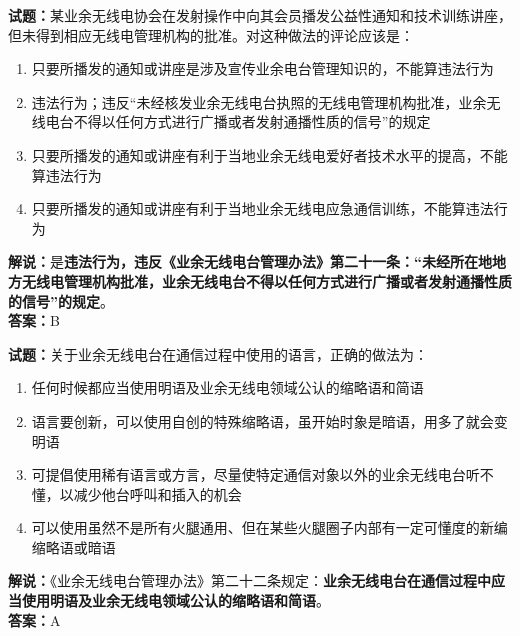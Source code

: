 \documentclass{ctexbook}
\begin{document}
\bigskip


\noindent\textbf{试题：}某业余无线电协会在发射操作中向其会员播发公益性通知和技术训练讲座，但未得到相应无线电管理机构的批准。对这种做法的评论应该是：
\begin{enumerate}[leftmargin=3em]
\item 只要所播发的通知或讲座是涉及宣传业余电台管理知识的，不能算违法行为
\item 违法行为；违反“未经核发业余无线电台执照的无线电管理机构批准，业余无线电台不得以任何方式进行广播或者发射通播性质的信号”的规定
\item 只要所播发的通知或讲座有利于当地业余无线电爱好者技术水平的提高，不能算违法行为
\item 只要所播发的通知或讲座有利于当地业余无线电应急通信训练，不能算违法行为
\end{enumerate}
\noindent\textbf{解说：}是\textbf{违法行为，违反《业余无线电台管理办法》第二十一条：“未经所在地地方无线电管理机构批准，业余无线电台不得以任何方式进行广播或者发射通播性质的信号”的规定}。\\\noindent\textbf{答案：}B





\bigskip


\noindent\textbf{试题：}关于业余无线电台在通信过程中使用的语言，正确的做法为：
\begin{enumerate}[leftmargin=3em]
\item 任何时候都应当使用明语及业余无线电领域公认的缩略语和简语
\item 语言要创新，可以使用自创的特殊缩略语，虽开始时象是暗语，用多了就会变明语
\item 可提倡使用稀有语言或方言，尽量使特定通信对象以外的业余无线电台听不懂，以减少他台呼叫和插入的机会
\item 可以使用虽然不是所有火腿通用、但在某些火腿圈子内部有一定可懂度的新编缩略语或暗语
\end{enumerate}
\noindent\textbf{解说：}《业余无线电台管理办法》第二十二条规定：\textbf{业余无线电台在通信过程中应当使用明语及业余无线电领域公认的缩略语和简语}。\\\noindent\textbf{答案：}A




\bigskip
\end{document}
